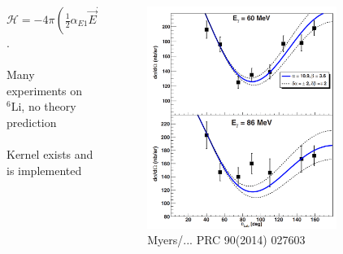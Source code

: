 \documentclass{beamer}
\newcommand{\LiS}{{}^{6} \mathrm{Li} }
\newcommand{\HeF}{{}^{4} \mathrm{He}}
\newcommand{\bv}{\vec}
\begin{document}
\begin{frame}
\begin{columns}
\begin{column}{.5\textwidth}
    $\mathcal{H}=-4\pi \left( \frac{1}{2} \alpha_{E1} \bv{E}^2 + \frac{1}{2} \beta_{M1} \bv{H}^2\right)$.\\~\\
    Many experiments on $\LiS$, no theory prediction \\~\\
    Kernel exists and is implemented\\
    \end{column}
    \begin{column}{.5\textwidth}
    \begin{figure}
    \includegraphics[width=0.8\textwidth]{Li6Feldman.png}
    \caption{Myers/... PRC 90(2014) 027603}
    \end{figure}
    \end{column}
\end{columns}
\end{frame}




\end{document}
